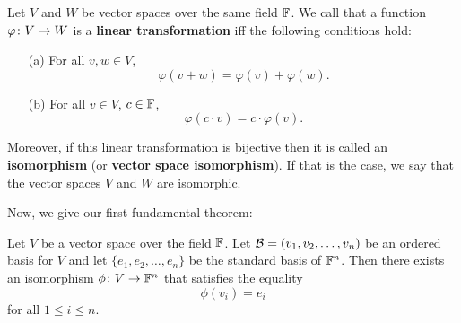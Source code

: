 \begin{remark}
    Let $V$ and $W$ be vector spaces over the same field $\mathbb{F}$. We call that
    a function $\varphi \colon V \to W$ is a \textbf{linear transformation}
    iff the following conditions hold:
    \begin{itemize}
        \item[(a)] For all $v, w \in V$,
        \[
            \varphi(v + w) = \varphi(v) + \varphi(w).
        \]
    
        \item[(b)] For all $v \in V$, $c \in \mathbb{F}$,
        \[
            \varphi(c \cdot v) = c \cdot \varphi(v).
        \]
    \end{itemize}
    Moreover, if this linear transformation is bijective then it is called
    an \textbf{isomorphism} (or \textbf{vector space isomorphism}). If that is
    the case, we say that the vector spaces $V$ and $W$ are isomorphic.
\end{remark}

Now, we give our first fundamental theorem:

\begin{theorem} \label{thrm1}
    Let $V$ be a vector space over the field $\mathbb{F}$. Let 
    $\mathcal{B} = (v_{1}, v_{2}, \dots, v_{n})$ be an ordered basis for $V$ and let
    $\{e_{1}, e_{2}, \dots, e_{n}\}$ be the standard basis of $\mathbb{F}^{n}$. Then
    there exists an isomorphism $\phi \colon V \to \mathbb{F}^{n}$ that satisfies the
    equality
    \[
        \phi(v_{i}) = e_{i}    
    \]
    for all $1 \leq i \leq n$.
\end{theorem}

